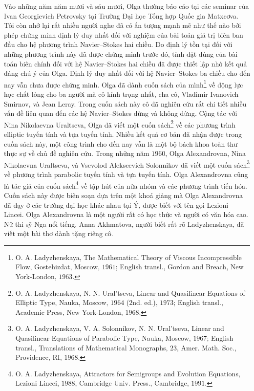 \begin{multicols}{2}
	Vào những năm năm mươi và sáu mươi, Olga thường báo cáo  tại các seminar của Ivan Georgievich Petrovsky tại Trường Đại học Tống hợp Quốc gia Matxcơva. Tôi còn  nhớ lại  rất nhiều người nghe đã có ấn tượng  mạnh mẽ như thế nào bởi phép chứng minh định lý duy nhất đối với nghiệm của bài toán giá trị biên ban đầu cho hệ phương trình Navier--Stokes hai chiều. Do định lý tồn tại đối với những phương trình này đã được chứng minh trước đó, tính đặt đúng của bài toán  biên chính đối với hệ Navier--Stokes hai chiều đã được thiết lập nhờ kết quả đáng chú ý của Olga. Định lý duy nhất đối với hệ  Navier--Stokes ba chiều cho đến nay vẫn chưa được chứng minh. Olga đã dành cuốn sách của mình\footnote[2]{\color{lichsutoanhoc}O. A. Ladyzhenskaya, The Mathematical Theory of Viscous Incompressible Flow, Gostehizdat, Moscow, $1961$; English transl., Gordon and Breach, New York-London, $1963$.}  về động lực học chất lỏng cho ba người mà cô kính trọng nhất, cha cô, Vladimir Ivanovich Smirnov, và Jean Leray. Trong cuốn sách này cô đã nghiên cứu rất  chi tiết nhiều vấn đề liên quan đến các hệ  Navier--Stokes dừng và  không dừng.
	\vskip 0.1cm
	Cộng tác với Nina Nikolaevna Uraltseva, Olga đã viết một cuốn sách\footnote[3]{\color{lichsutoanhoc}O. A. Ladyzhenskaya, N. N. Ural'tseva, Linear and Quasilinear Equations of Elliptic Type, Nauka, Moscow, $1964$ ($2$nd. ed.), $1973$; English transl., Academic Press, New York-London, $1968$.}  về các phương trình elliptic tuyến tính và tựa tuyến tính. Nhiều kết quả cơ bản đã nhận được trong cuốn sách này, một công trình cho đến nay vẫn là một bộ bách khoa toàn thư thực sự về chủ đề nghiên cứu. Trong những năm $1960$, Olga Alexandrovna, Nina Nikolaevna Uraltseva, và Vsevolod Alekseevich Solonnikov đã viết một cuốn sách\footnote[4]{\color{lichsutoanhoc}O. A. Ladyzhenskaya, V. A. Solonnikov,  N. N. Ural'tseva, Linear and Quasilinear Equations of Parabolic Type, Nauka, Moscow, $1967$; English transl., Translations of Mathematical Monographs, $23$, Amer. Math. Soc., Providence, RI, $1968$.}  về phương trình parabolic tuyến tính và tựa tuyến tính. Olga Alexandrovna cũng là tác giả của cuốn sách\footnote[5]{\color{lichsutoanhoc}O. A. Ladyzhenskaya, Attractors for Semigroups and Evolution Equations, Lezioni Lincei, $1988$, Cambridge Univ. Press., Cambridge, $1991$.}  về tập hút của nửa nhóm và các phương trình tiến hóa. Cuốn sách này được biên soạn dựa trên một khoá giảng mà Olga Alexandrovna đã dạy ở các trường đại học khác nhau tại Ý, được biết với tên gọi Lezioni Lincei. Olga Alexandrovna là một người rất có học thức và người có văn hóa cao. Nữ thi sỹ Nga nổi tiếng, Anna Akhmatova, người biết rất rõ Ladyzhenskaya,  đã viết một bài thơ dành tặng riêng cô.

\end{multicols}
